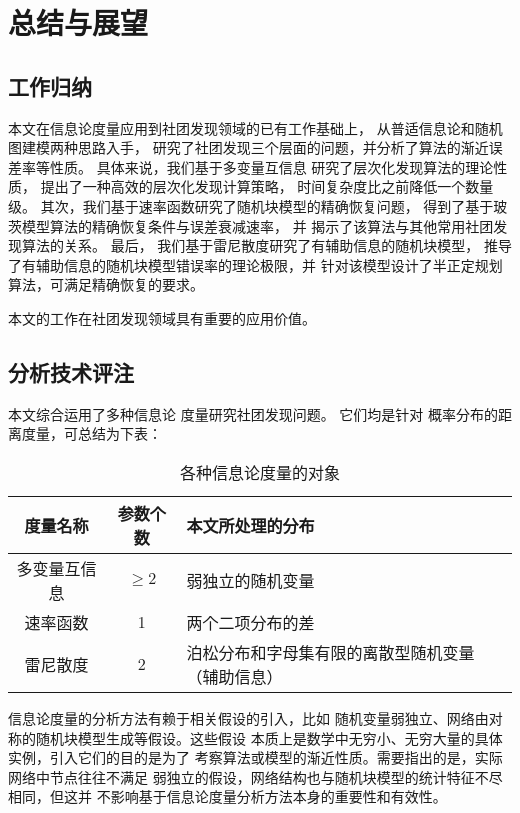 \chapter{总结与展望}\label{chp:summary}
\section{工作归纳}
本文在信息论度量应用到社团发现领域的已有工作基础上，
从普适信息论和随机图建模两种思路入手，
研究了社团发现三个层面的问题，并分析了算法的渐近误差率等性质。
具体来说，我们基于多变量互信息
研究了层次化发现算法的理论性质，
提出了一种高效的层次化发现计算策略，
时间复杂度比之前降低一个数量级。
其次，我们基于速率函数研究了随机块模型的精确恢复问题，
得到了基于玻茨模型算法的精确恢复条件与误差衰减速率，
并
揭示了该算法与其他常用社团发现算法的关系。
最后， 我们基于雷尼散度研究了有辅助信息的随机块模型，
推导了有辅助信息的随机块模型错误率的理论极限，并
针对该模型设计了半正定规划算法，可满足精确恢复的要求。

本文的工作在社团发现领域具有重要的应用价值。

\section{分析技术评注}
本文综合运用了多种信息论
度量研究社团发现问题。
它们均是针对
概率分布的距离度量，可总结为下表：
\begin{table}[!ht]
    \centering
  \begin{tabular}{ccp{5cm}}
    \hline
     度量名称    &   参数个数 &   本文所处理的分布 \\
    \hline
     多变量互信息 &    $\geq 2$ &    弱独立的随机变量  \\
     速率函数     &    1 &     两个二项分布的差  \\
     雷尼散度     &    2 &    泊松分布和字母集有限的离散型随机变量（辅助信息） \\
    \hline
  \end{tabular}
  \caption{各种信息论度量的对象}\label{tab:info_metric}
\end{table}
  
信息论度量的分析方法有赖于相关假设的引入，比如
随机变量弱独立、网络由对称的随机块模型生成等假设。这些假设
本质上是数学中无穷小、无穷大量的具体实例，引入它们的目的是为了
考察算法或模型的渐近性质。需要指出的是，实际网络中节点往往不满足
弱独立的假设，网络结构也与随机块模型的统计特征不尽相同，但这并
不影响基于信息论度量分析方法本身的重要性和有效性。

